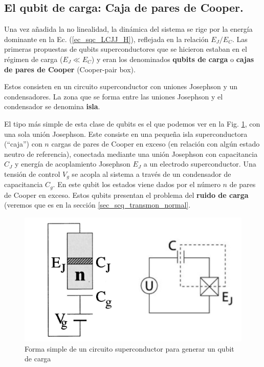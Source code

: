        

        
    \subsection{El qubit de carga: Caja de pares de Cooper.}

    Una vez añadida la no linealidad, la dinámica del sistema se rige por la energía dominante en la Ec. (\ref{ec_sqc_LCJJ_H}), reflejada en la relación $E_J/E_C$. Las primeras propuestas de qubits superconductores que se hicieron estaban en el régimen de carga ($E_J \ll E_C$) y eran los denominados \textbf{qubits de carga} o \textbf{cajas de pares de Cooper} (Cooper-pair box). 

    Estos consisten en un circuito superconductor con uniones Josephson y un condensadores. La zona que se forma entre las uniones Josephson y el condensador se denomina \textbf{isla}. 
    
    El tipo más simple de esta clase de qubits es el que podemos ver en la Fig. \ref{Fig_scq_charge_qubit}, con una sola unión Josephson.  Este consiste en una pequeña isla superconductora (``caja'') con $n$ cargas de pares de Cooper en exceso (en relación con algún estado neutro de referencia), conectada mediante una unión Josephson con capacitancia $C_J$ y energía de acoplamiento Josephson $E_J$ a un electrodo superconductor. Una tensión de control $V_g$ se acopla al sistema a través de un condensador de capacitancia $C_g$. En este qubit los estados viene dados por el número $n$ de pares de Cooper en exceso. Estos qubits presentan el problema del \textbf{ruido de carga} (veremos que es en la sección \ref{sec_scq_transmon_normal}.
    
    	\begin{figure}[h]
    	\centering 
    	\includegraphics[width=0.5\linewidth]{Figuras/Fig_scq_charge_qubit.png}
    	\caption{Forma simple de un circuito superconductor para generar un qubit de carga}
    	\label{Fig_scq_charge_qubit}
    	\end{figure}

    
    
    
